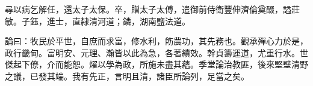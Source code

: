 \begin{pinyinscope}
尋以病乞解任，還太子太保。卒，贈太子太傅，遣御前侍衛豐伸濟倫奠醊，謚莊敏。子鈺，進士，直隸清河道；鏻，湖南鹽法道。

論曰：牧民於平世，自庶而求富，修水利，飭農功，其先務也。觀承殫心力於是，政行畿甸。富明安、元理、瀚皆以此為急，各著績效。幹貞籌運道，尤重行水。世傑起下僚，介而能恕。燿以學為政，所施未盡其蘊。季堂論治教匪，後來堅壁清野之議，已發其端。我有先正，言明且清，諸臣所論列，足當之矣。


\end{pinyinscope}